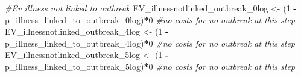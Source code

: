 \documentclass[
]{article}
\newenvironment{Shaded}{\begin{snugshade}}{\end{snugshade}}
\newcommand{\CommentTok}[1]{\textcolor[rgb]{0.56,0.35,0.01}{\textit{#1}}}
\newcommand{\DecValTok}[1]{\textcolor[rgb]{0.00,0.00,0.81}{#1}}
\newcommand{\NormalTok}[1]{#1}
\newcommand{\OtherTok}[1]{\textcolor[rgb]{0.56,0.35,0.01}{#1}}
\newcommand{\SpecialCharTok}[1]{\textcolor[rgb]{0.81,0.36,0.00}{\textbf{#1}}}
\begin{document}
\begin{Shaded}
\begin{Highlighting}[]
\CommentTok{\#Ev illness not linked to outbreak}
\NormalTok{EV\_illnessnotlinked\_outbreak\_0log }\OtherTok{\textless{}{-}}\NormalTok{ (}\DecValTok{1} \SpecialCharTok{{-}}\NormalTok{ p\_illness\_linked\_to\_outbreak\_0log)}\SpecialCharTok{*}\DecValTok{0} \CommentTok{\#no costs for no outbreak at this step}
\NormalTok{EV\_illnessnotlinked\_outbreak\_4log }\OtherTok{\textless{}{-}}\NormalTok{ (}\DecValTok{1} \SpecialCharTok{{-}}\NormalTok{ p\_illness\_linked\_to\_outbreak\_4log)}\SpecialCharTok{*}\DecValTok{0} \CommentTok{\#no costs for no outbreak at this step}
\NormalTok{EV\_illnessnotlinked\_outbreak\_5log }\OtherTok{\textless{}{-}}\NormalTok{ (}\DecValTok{1} \SpecialCharTok{{-}}\NormalTok{ p\_illness\_linked\_to\_outbreak\_5log)}\SpecialCharTok{*}\DecValTok{0} \CommentTok{\#no costs for no outbreak at this step}
\end{Highlighting}
\end{Shaded}
\end{document}
